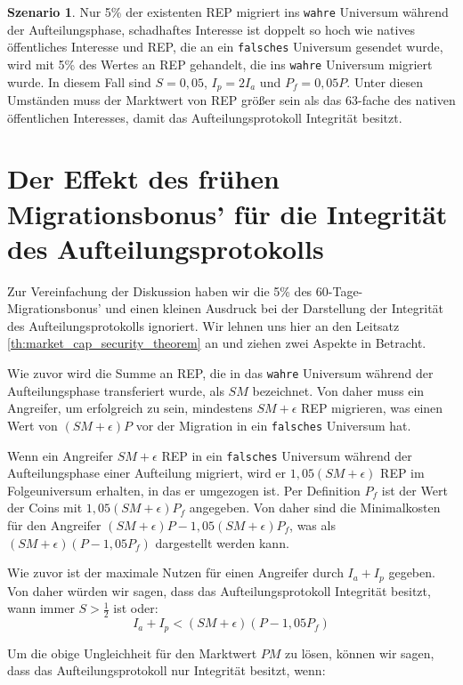 \documentclass[floatfix,reprint,nofootinbib,amsmath,amssymb,epsfig,pre,floats,letterpaper,groupedaffiliation]{revtex4-1}
\newcommand{\beq}{\begin{equation}}
\newcommand{\eeq}{\end{equation}}
\theoremstyle{definition}
\theoremstyle{definition}
\theoremstyle{definition}
\newtheorem{scenario}{Szenario}
\begin{document}
\begin{appendix}
\begin{scenario}
Nur 5\% der existenten REP migriert ins \texttt{wahre} Universum während der Aufteilungsphase, schadhaftes Interesse ist doppelt so hoch wie natives öffentliches Interesse und REP, die an ein \texttt{falsches} Universum gesendet wurde, wird mit 5\% des Wertes an REP gehandelt, die ins \texttt{wahre} Universum migriert wurde. In diesem Fall sind $S = 0,05$, $I_p = 2I_a$ und $P_f = 0,05P$. Unter diesen Umständen muss der Marktwert von REP größer sein als das 63-fache des nativen öffentlichen Interesses, damit das Aufteilungsprotokoll Integrität besitzt.
\end{scenario}

\section{Der Effekt des frühen Migrationsbonus' für die Integrität des Aufteilungsprotokolls}\label{ap:early_migration_integrity}

Zur Vereinfachung der Diskussion haben wir die 5\% des 60-Tage-Migrationsbonus' und einen kleinen Ausdruck bei der Darstellung der Integrität des Aufteilungsprotokolls ignoriert. Wir lehnen uns hier an den Leitsatz \ref{th:market_cap_security_theorem} an und ziehen zwei Aspekte in Betracht.

Wie zuvor wird die Summe an REP, die in das \texttt{wahre} Universum während der Aufteilungsphase transferiert wurde, als $SM$ bezeichnet. Von daher muss ein Angreifer, um erfolgreich zu sein, mindestens $SM+\epsilon$ REP migrieren, was einen Wert von $(SM+\epsilon)P$ vor der Migration in ein \texttt{falsches} Universum hat.

Wenn ein Angreifer $SM+\epsilon$ REP in ein \texttt{falsches} Universum während der Aufteilungsphase einer Aufteilung migriert, wird er $1,05(SM+\epsilon)$ REP im Folgeuniversum erhalten, in das er umgezogen ist. Per Definition $P_f$ ist der Wert der Coins mit $1,05(SM+\epsilon)P_f$ angegeben. Von daher sind die Minimalkosten für den Angreifer $(SM+\epsilon)P-1,05(SM+\epsilon)P_f$, was als $(SM+\epsilon)(P-1,05P_f)$ dargestellt werden kann.

Wie zuvor ist der maximale Nutzen für einen Angreifer durch $I_a + I_p$ gegeben. Von daher würden wir sagen, dass das Aufteilungsprotokoll Integrität besitzt, wann immer $S > \frac{1}{2}$ ist oder:
\beq\label{eq:market_cap_security_requirement_detailed}
I_a + I_p < (SM+\epsilon)(P-1,05P_f)
\eeq

Um die obige Ungleichheit für den Marktwert $PM$ zu lösen, können wir sagen, dass das Aufteilungsprotokoll nur Integrität besitzt, wenn:


\end{appendix}
\end{document}
